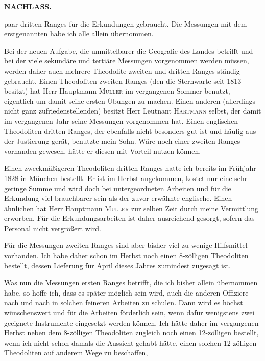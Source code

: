 \par\clearpage
\noindent{}\hfill{\small\textbf{NACHLASS.}}\hfill\null\par\medskip
\noindent paar dritten Ranges für die Erkundungen gebraucht. Die Messungen mit dem erstgenannten habe ich alle allein übernommen.

\par\noindent\hspace*{\parindent}Bei der neuen Aufgabe, die unmittelbarer die Geografie des Landes betrifft und bei der viele sekundäre und tertiäre Messungen vorgenommen werden müssen, werden daher auch mehrere Theodolite zweiten und dritten Ranges ständig gebraucht. Einen Theodoliten zweiten Ranges (den die Sternwarte seit 1813 besitzt) hat Herr Hauptmann \textsc{Müller} im vergangenen Sommer benutzt, eigentlich um damit seine ersten Übungen zu machen. Einen anderen (allerdings nicht ganz zufriedenstellenden) besitzt Herr Leutnant \textsc{Hartmann} selbst, der damit im vergangenen Jahr seine Messungen vorgenommen hat. Einen englischen Theodoliten dritten Ranges, der ebenfalls nicht besonders gut ist und häufig aus der Justierung gerät, benutzte mein Sohn. Wäre noch einer zweiten Ranges vorhanden gewesen, hätte er diesen mit Vorteil nutzen können.

\par\noindent\hspace*{\parindent}Einen zweckmäßigeren Theodoliten dritten Ranges hatte ich bereits im Frühjahr 1828 in München bestellt. Er ist im Herbst angekommen, kostet nur eine sehr geringe Summe und wird doch bei untergeordneten Arbeiten und für die Erkundung viel brauchbarer sein als der zuvor erwähnte englische. Einen ähnlichen hat Herr Hauptmann \textsc{Müller} zur selben Zeit durch meine Vermittlung erworben. Für die Erkundungsarbeiten ist daher ausreichend gesorgt, sofern das Personal nicht vergrößert wird.

\par\noindent\hspace*{\parindent}Für die Messungen zweiten Ranges sind aber bisher viel zu wenige Hilfsmittel vorhanden. Ich habe daher schon im Herbst noch einen 8-zölligen Theodoliten bestellt, dessen Lieferung für April dieses Jahres zumindest zugesagt ist.

\par\noindent\hspace*{\parindent}Was nun die Messungen ersten Ranges betrifft, die ich bisher allein übernommen habe, so hoffe ich, dass es später möglich sein wird, auch die anderen Offiziere nach und nach in solchen feineren Arbeiten zu schulen. Dann wird es höchst wünschenswert und für die Arbeiten förderlich sein, wenn dafür wenigstens zwei geeignete Instrumente eingesetzt werden können. Ich hätte daher im vergangenen Herbst neben dem 8-zölligen Theodoliten zugleich noch einen 12-zölligen bestellt, wenn ich nicht schon damals die Aussicht gehabt hätte, einen solchen 12-zölligen Theodoliten auf anderem Wege zu beschaffen,

